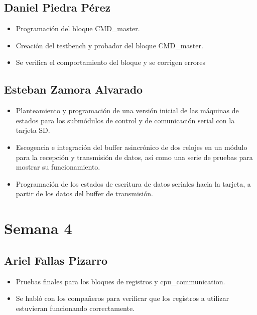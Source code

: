 \subsection{Daniel Piedra Pérez}
\begin{itemize}
\item Programación del bloque CMD\_master.
\item Creación del testbench y probador del bloque CMD\_master.
\item Se verifica el comportamiento del bloque y se corrigen errores
\end{itemize}

\subsection{Esteban Zamora Alvarado}
\begin{itemize}
\item Planteamiento y programación de una versión inicial de las máquinas de estados para los
  submódulos de control y de comunicación serial con la tarjeta SD.
\item Escogencia e integración del buffer asincrónico de dos relojes en un módulo para la recepción
  y transmisión de datos, así como una serie de pruebas para mostrar su funcionamiento.
\item Programación de los estados de escritura de datos seriales hacia la tarjeta, a partir de los datos
  del buffer de transmisión. 
\end{itemize}
\newpage

\section{Semana 4}
\subsection{Ariel Fallas Pizarro}
\begin{itemize}
\item Pruebas finales para los bloques de registros y cpu\_communication.
\item Se habló con los compañeros para verificar que los registros a utilizar estuvieran funcionando correctamente.
\end{itemize}

